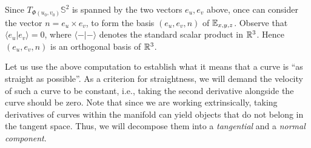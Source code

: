 \documentclass[11pt,a4paper,twoside,openany]{report}
\theoremstyle{my-theorem}
\theoremstyle{non-theorem}
\begin{document}
			Since $T_{\Phi(u_0,v_0)} \mathbb S^2$ is spanned by the two vectors $e_u, e_v$ above, once can consider the vector $n = e_u \times e_v$, to form the basis $(e_u,e_v,n)$ of ${\mathbb E}_{x,y,z}$. Observe that $\langle e_u | e_v \rangle = 0$, where $\langle - | - \rangle$ denotes the standard scalar product in ${\mathbb R}^3$. Hence $(e_u,e_v,n)$ is an orthogonal basis of ${\mathbb R}^3$.
			
			Let us use the above computation to establish what it means that a curve is ``as straight as possible''. As a criterion for straightness, we will demand the velocity of such a curve to be constant, i.e., taking the second derivative alongside the curve should be zero. Note that since we are working extrinsically, taking derivatives of curves within the manifold can yield objects that do not belong in the tangent space. Thus, we will decompose them into a \emph{tangential} and a \emph{normal component}.
			
\end{document}
